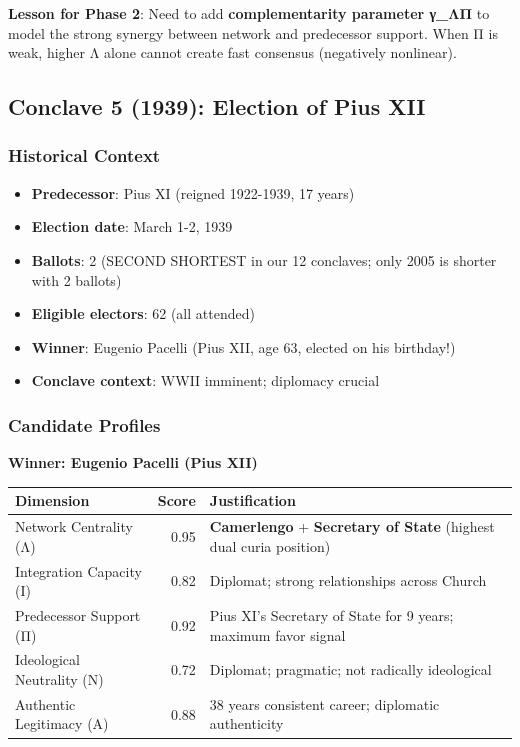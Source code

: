 \textbf{Lesson for Phase 2}: Need to add \textbf{complementarity parameter γ_ΛΠ} to model the strong synergy between network and predecessor support. When Π is weak, higher Λ alone cannot create fast consensus (negatively nonlinear).


\subsection{Conclave 5 (1939): Election of Pius XII}

\subsubsection{Historical Context}

\begin{itemize}
    \item \textbf{Predecessor}: Pius XI (reigned 1922-1939, 17 years)
    \item \textbf{Election date}: March 1-2, 1939
    \item \textbf{Ballots}: 2 (SECOND SHORTEST in our 12 conclaves; only 2005 is shorter with 2 ballots)
    \item \textbf{Eligible electors}: 62 (all attended)
    \item \textbf{Winner}: Eugenio Pacelli (Pius XII, age 63, elected on his birthday!)
    \item \textbf{Conclave context}: WWII imminent; diplomacy crucial
\end{itemize}

\subsubsection{Candidate Profiles}

\textbf{Winner: Eugenio Pacelli (Pius XII)}

\begin{center}
\begin{tabular}{lrp{4cm}}
\toprule
\textbf{Dimension} & \textbf{Score} & \textbf{Justification} \\
\midrule
Network Centrality (Λ) & 0.95 & \textbf{Camerlengo} + \textbf{Secretary of State} (highest dual curia position) \\
Integration Capacity (Ι) & 0.82 & Diplomat; strong relationships across Church \\
Predecessor Support (Π) & 0.92 & Pius XI's Secretary of State for 9 years; maximum favor signal \\
Ideological Neutrality (Ν) & 0.72 & Diplomat; pragmatic; not radically ideological \\
Authentic Legitimacy (Α) & 0.88 & 38 years consistent career; diplomatic authenticity \\
\bottomrule
\end{tabular}
\end{center}

